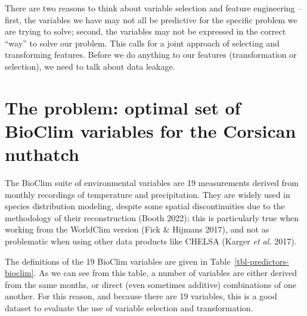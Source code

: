 \documentclass[
  letterpaper,
]{scrbook}
\begin{document}
There are two reasons to think about variable selection and feature
engineering -- first, the variables we have may not all be predictive
for the specific problem we are trying to solve; second, the variables
may not be expressed in the correct ``way'' to solve our problem. This
calls for a joint approach of selecting and transforming features.
Before we do anything to our features (transformation or selection), we
need to talk about data leakage.

\section{The problem: optimal set of BioClim variables for the Corsican
nuthatch}\label{the-problem-optimal-set-of-bioclim-variables-for-the-corsican-nuthatch}

The BioClim suite of environmental variables are 19 measurements derived
from monthly recordings of temperature and precipitation. They are
widely used in species distribution modeling, despite some spatial
discontinuities due to the methodology of their reconstruction (Booth
2022); this is particularly true when working from the WorldClim version
(Fick \& Hijmans 2017), and not as problematic when using other data
products like CHELSA (Karger \emph{et al.} 2017).

The definitions of the 19 BioClim variables are given in
Table~\ref{tbl-predictors-bioclim}. As we can see from this table, a
number of variables are either derived from the same months, or direct
(even sometimes additive) combinations of one another. For this reason,
and because there are 19 variables, this is a good dataset to evaluate
the use of variable selection and transformation.
\end{document}
